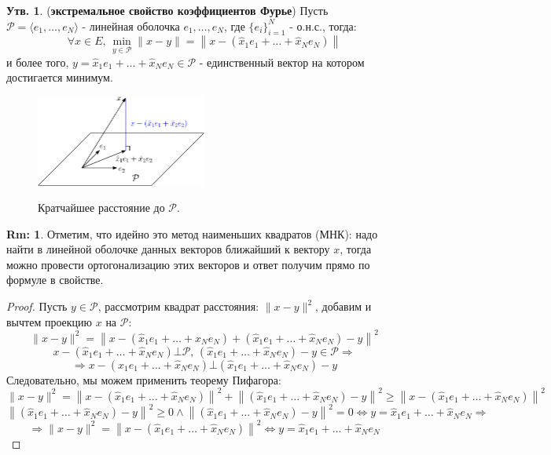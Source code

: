 \documentclass[12pt]{article}
\newcommand{\MP}{\mathcal{P}}
\theoremstyle{definition}
\newtheorem{rem}{Rm:}
\newtheorem{prop}{Утв.}
\begin{document}
\begin{prop}(\textbf{экстремальное свойство коэффициентов Фурье}) 
	Пусть $\MP = \langle e_1, \dotsc, e_N \rangle$ - линейная оболочка $e_1, \dotsc, e_N$, где $\{e_i\}_{i =1}^{N}$ - о.н.с., тогда:
	$$
		\forall x \in E, \, \min\limits_{y \in \MP}{\|x - y\|} = \left\|x - (\hat{x}_1 e_1 + \dotsc + \hat{x}_N e_N)\right\|
	$$
	и более того, $y = \hat{x}_1 e_1 + \dotsc + \hat{x}_N e_N \in \MP$ - единственный вектор на котором достигается минимум.
\end{prop}
\begin{figure}[H]
	\centering
	\includegraphics[width=0.5\textwidth]{MA3L27_3.eps}
	\label{MA3L27_3}
	\caption{Кратчайшее расстояние до $\MP$.}
	\label{fig: Кратчайшее расстояние}
\end{figure}
\begin{rem}
	Отметим, что идейно это метод наименьших квадратов (МНК): надо найти в линейной оболочке данных векторов ближайший к вектору $x$, тогда можно провести ортогонализацию этих векторов и ответ получим прямо по формуле в свойстве.
\end{rem}
\begin{proof}
	Пусть $y \in \MP$, рассмотрим квадрат расстояния: $\|x - y\|^2$, добавим и вычтем проекцию $x$ на $\MP$:
	$$
		\|x - y\|^2 = \left\|x - (\hat{x}_1 e_1 + \dotsc + \hat{x}_N e_N) + (\hat{x}_1 e_1 + \dotsc + \hat{x}_N e_N) - y\right\|^2
	$$
	$$
		x - (\hat{x}_1 e_1 + \dotsc + \hat{x}_N e_N) \bot \MP, \, (\hat{x}_1 e_1 + \dotsc + \hat{x}_N e_N) - y \in \MP \Rightarrow 
	$$
	$$
		\Rightarrow x - (\hat{x}_1 e_1 + \dotsc + \hat{x}_N e_N) \bot (\hat{x}_1 e_1 + \dotsc + \hat{x}_N e_N) - y
	$$
	Следовательно, мы можем применить теорему Пифагора:
	$$
		\|x - y\|^2 = \left\|x - (\hat{x}_1 e_1 + \dotsc + \hat{x}_N e_N)\right\|^2 + \left\| (\hat{x}_1 e_1 + \dotsc + \hat{x}_N e_N) - y\right\|^2 \geq \left\|x - (\hat{x}_1 e_1 + \dotsc + \hat{x}_N e_N)\right\|^2
	$$
	$$
		\left\| (\hat{x}_1 e_1 + \dotsc + \hat{x}_N e_N) - y\right\|^2\geq 0 \wedge \left\| (\hat{x}_1 e_1 + \dotsc + \hat{x}_N e_N) - y\right\|^2 = 0 \Leftrightarrow y = \hat{x}_1 e_1 + \dotsc + \hat{x}_N e_N \Rightarrow
	$$
	$$
		\Rightarrow \|x - y\|^2  = \left\|x - (\hat{x}_1 e_1 + \dotsc + \hat{x}_N e_N)\right\|^2 \Leftrightarrow y = \hat{x}_1 e_1 + \dotsc + \hat{x}_N e_N
	$$
\end{proof}
\end{document}
